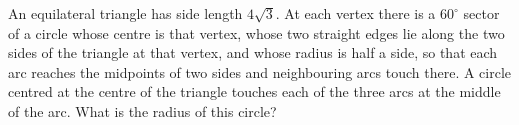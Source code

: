 An equilateral triangle has side length $4\sqrt3$. At each vertex there is a $60^\circ$ sector of a circle whose centre is that vertex, whose two straight edges lie along the two sides of the triangle at that vertex, and whose radius is half a side, so that each arc reaches the midpoints of two sides and neighbouring arcs touch there. A circle centred at the centre of the triangle touches each of the three arcs at the middle of the arc. What is the radius of this circle?

